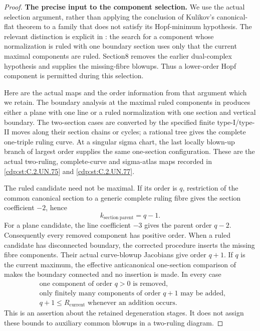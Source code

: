 \begin{proof}
\par\medskip\noindent\textbf{The precise input to the component selection.}
We use the actual selection argument, rather than
applying the conclusion of Kulikov's canonical-flat
theorem to a family that does not satisfy its
Hopf-minimum hypothesis. The relevant distinction
is explicit in \cite[\S7]{Kulikov1981}: the search
for a component whose normalization is ruled with
one boundary section uses only that the current
maximal components are ruled. Section8 removes
the earlier dual-complex hypothesis and supplies
the missing-fibre blowups. Thus a lower-order Hopf
component is permitted during this selection.

Here are the actual maps and the order information
from that argument which we retain. The boundary
analysis at the maximal ruled components in
\cite[\S\S4.8.5--4.8.12,4.16.2--4.16.6]{Kulikov1977}
produces either a plane with one line or a ruled
normalization with one section and vertical boundary.
The two-section cases are converted by the specified
finite type-I/type-II moves along their section
chains or cycles; a rational tree gives the complete
one-triple ruling curve. At a singular sigma chart,
the last locally blown-up branch of largest order
supplies the same one-section configuration. These
are the actual two-ruling, complete-curve and
sigma-atlas maps recorded in \ref{cdp:st:C.2.UN.75} and \ref{cdp:st:C.2.UN.77}.

The ruled candidate need not be maximal. If its
order is \(q\), restriction of the common canonical
section to a generic complete ruling fibre gives
the section coefficient \(-2\), hence
\[
       k_{\mathrm{section\ parent}}=q-1.
 \tag{C.TK.3}\label{cdp:eq:C.TK.3}
\]
For a plane candidate, the line coefficient \(-3\)
gives the parent order \(q-2\). Consequently every
removed component has positive order. When a ruled
candidate has disconnected boundary, the corrected
procedure inserts the missing fibre components.
Their actual curve-blowup Jacobians give order
\(q+1\). If \(q\) is the current maximum, the
effective anticanonical one-section comparison
of \cite[Lemma2.19]{Kulikov1977} makes the boundary
connected and no insertion is made. In every case
\[
 \begin{split}
 &\text{one component of order }q>0\text{ is removed},\\
 &\text{only finitely many components of order }q+1
       \text{ may be added},\\
 &q+1\le R_{\mathrm{current}}\text{ whenever an addition occurs}.
 \end{split}
 \tag{C.TK.4}\label{cdp:eq:C.TK.4}
\]
This is an assertion about the retained degeneration
stages. It does not assign these bounds to auxiliary
common blowups in a two-ruling diagram.


\end{proof}
